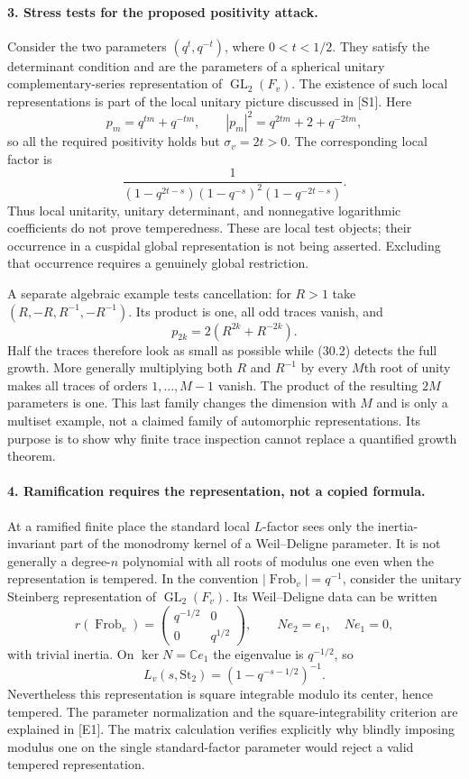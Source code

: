 \documentclass[11pt]{article}
\begin{document}
\paragraph{3. Stress tests for the proposed positivity attack.}
Consider the two parameters $(q^t,q^{-t})$, where $0<t<1/2$. They satisfy
the determinant condition and are the parameters of a spherical unitary
complementary-series representation of $\operatorname{GL}_2(F_v)$.
The existence of such local representations is part of the local unitary
picture discussed in [S1]. Here
\[
 p_m=q^{tm}+q^{-tm},\qquad
 |p_m|^2=q^{2tm}+2+q^{-2tm},
\]
so all the required positivity holds but $\sigma_v=2t>0$.
The corresponding local factor is
\[
 \frac{1}{(1-q^{2t-s})(1-q^{-s})^2(1-q^{-2t-s})}.
 \tag{30.8}
\]
Thus local unitarity, unitary determinant, and nonnegative logarithmic
coefficients do not prove temperedness. These are local test objects;
their occurrence in a cuspidal global representation is not being asserted.
Excluding that occurrence requires a genuinely global restriction.

A separate algebraic example tests cancellation: for $R>1$ take
$(R,-R,R^{-1},-R^{-1})$. Its product is one, all odd traces vanish, and
\[
 p_{2k}=2(R^{2k}+R^{-2k}).
 \tag{30.9}
\]
Half the traces therefore look as small as possible while (30.2) detects
the full growth. More generally multiplying both $R$ and $R^{-1}$ by every
$M$th root of unity makes all traces of orders $1,\ldots,M-1$ vanish.
The product of the resulting $2M$ parameters is one. This last family
changes the dimension with $M$ and is only a multiset example, not a
claimed family of automorphic representations. Its purpose is to show why
finite trace inspection cannot replace a quantified growth theorem.

\paragraph{4. Ramification requires the representation, not a copied formula.}
At a ramified finite place the standard local $L$-factor sees only the
inertia-invariant part of the monodromy kernel of a Weil--Deligne parameter.
It is not generally a degree-$n$ polynomial with all roots of modulus one
even when the representation is tempered. In the convention
$|\operatorname{Frob}_v|=q^{-1}$, consider the unitary Steinberg
representation of $\operatorname{GL}_2(F_v)$. Its Weil--Deligne data can be
written
\[
 r(\operatorname{Frob}_v)=
 \begin{pmatrix}q^{-1/2}&0\\0&q^{1/2}\end{pmatrix},\qquad
 Ne_2=e_1,\quad Ne_1=0,
\]
with trivial inertia. On $\ker N=\mathbb Ce_1$ the eigenvalue is
$q^{-1/2}$, so
\[
 L_v(s,\mathrm{St}_2)=(1-q^{-s-1/2})^{-1}.
 \tag{30.10}
\]
Nevertheless this representation is square integrable modulo its center,
hence tempered. The parameter normalization and the square-integrability
criterion are explained in [E1]. The matrix calculation verifies explicitly
why blindly imposing modulus one on the single standard-factor parameter
would reject a valid tempered representation.
\end{document}
